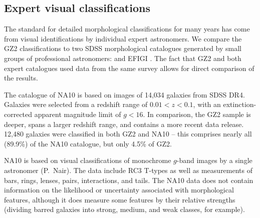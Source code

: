 \documentclass[useAMS,usenatbib]{mn2e}
\begin{document}
\subsection{Expert visual classifications}

The standard for detailed morphological classifications for many years has come from visual identifications by individual expert astronomers. We compare the GZ2 classifications to two SDSS morphological catalogues generated by small groups of professional astronomers: \citet[][hereafter NA10]{nai10} and EFIGI \citep{bai11}. The fact that GZ2 and both expert catalogues used data from the same survey allows for direct comparison of the results.

The catalogue of NA10 is based on images of 14,034 galaxies from SDSS DR4. Galaxies were selected from a redshift range of $0.01<z<0.1$, with an extinction-corrected apparent magnitude limit of $g<16$. In comparison, the GZ2 sample is deeper, spans a larger redshift range, and contains a more recent data release. 12,480 galaxies were classified in both GZ2 and NA10 -- this comprises nearly all (89.9\%) of the NA10 catalogue, but only 4.5\% of GZ2. 

NA10 is based on visual classifications of monochrome $g$-band images by a single astronomer (P.~Nair). The data include RC3 T-types \citep[a numerical index of a galaxy's stage along the Hubble sequence;][]{dev91} as well as measurements of bars, rings, lenses, pairs, interactions, and tails. The NA10 data does not contain information on the likelihood or uncertainty associated with morphological features, although it does measure some features by their relative strengths (dividing barred galaxies into strong, medium, and weak classes, for example). 

\end{document}
